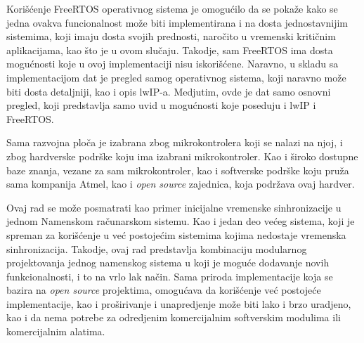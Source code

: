 \documentclass[a4paper,12pt, master]{etf}
\begin{document}
	Kori\v{s}\'{c}enje FreeRTOS operativnog sistema je omogu\'{c}ilo da se
	poka\v{z}e kako se jedna ovakva funcionalnost mo\v{z}e biti implementirana
	i na dosta jednostavnijim sistemima, koji imaju dosta svojih prednosti,
	naro\v{c}ito u vremenski kriti\v{c}nim aplikacijama, kao \v{s}to je u ovom
	slu\v{c}aju. Takodje, sam FreeRTOS ima dosta mogu\'{c}nosti koje u ovoj
	implementaciji nisu iskori\v{s}\'{c}ene. Naravno, u skladu sa
	implementacijom dat je pregled samog operativnog sistema, koji naravno
	mo\v{z}e biti dosta detaljniji, kao i opis lwIP-a. Medjutim, ovde je dat
	samo osnovni pregled, koji predstavlja samo uvid u mogu\'{c}nosti koje
	poseduju i lwIP i FreeRTOS.

	Sama razvojna plo\v{c}a je izabrana zbog mikrokontrolera koji se nalazi na
	njoj, i zbog hardverske podr\v{s}ke koju ima izabrani mikrokontroler. Kao i
	\v{s}iroko dostupne baze znanja, vezane za sam mikrokontroler, kao i
	softverske podr\v{s}ke koju pru\v{z}a sama kompanija Atmel, kao i
	\textit{open source} zajednica, koja podr\v{z}ava ovaj hardver.

	Ovaj rad se mo\v{z}e posmatrati kao primer inicijalne vremenske
	sinhronizacije u jednom Namenskom ra\v{c}unarskom sistemu. Kao i jedan deo
	ve\'{c}eg sistema, koji je spreman za kori\v{s}\'{c}enje u ve\'{c}
	postoje\'{c}im sistemima kojima nedostaje vremenska sinhronizacija. Takodje,
	 ovaj rad predstavlja kombinaciju modularnog projektovanja jednog namenskog
	sistema u koji je mogu\'{c}e dodavanje novih funkcionalnosti, i to na vrlo
	lak na\v{c}in. Sama priroda implementacije koja se bazira na
	\textit{open source} projektima, omogu\'{c}ava da kori\v{s}\'{c}enje
	ve\'{c} postoje\'{c}e implementacije, kao i pro\v{s}irivanje i unapredjenje
	mo\v{z}e biti lako i brzo uradjeno, kao i da nema potrebe za odredjenim
	komercijalnim softverskim modulima ili komercijalnim alatima.

    \newpage
\end{document}
